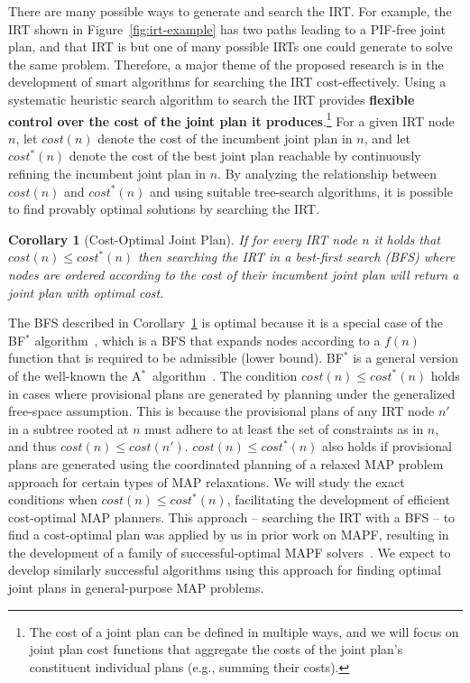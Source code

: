 \documentclass[11pt]{article}
\newcommand{\astar}{A$^*$}
\newtheorem{corollary}{Corollary}
\begin{document}
There are many possible ways to generate and search the IRT. For example, the IRT shown in Figure~\ref{fig:irt-example} has two paths leading to a PIF-free joint plan, and that IRT is but one of many possible IRTs one could generate to solve the same problem. Therefore, a major theme of the proposed research is in the development of smart algorithms for searching the IRT cost-effectively. %
Using a systematic heuristic search algorithm to search the IRT provides {\bf flexible control over the cost of the joint plan it produces}.\footnote{The cost of a joint plan can be defined in multiple ways, and we will focus on joint plan cost functions that aggregate the costs of the joint plan's constituent individual plans (e.g., summing their costs).} 
For a given IRT node $n$, let $cost(n)$ denote the cost of the incumbent joint plan in $n$, and let $cost^*(n)$ denote the cost of the best joint plan reachable by continuously refining the incumbent joint plan in $n$.
By analyzing the relationship between $cost(n)$ and $cost^*(n)$ and using suitable tree-search algorithms, it is possible to find provably optimal solutions by searching the IRT. 


\begin{corollary}[Cost-Optimal Joint Plan]
If for every IRT node $n$ it holds that $cost(n)\leq cost^*(n)$ then searching the IRT in a best-first search (BFS) where nodes are ordered according to the cost of their incumbent joint plan 
will return a joint plan with optimal cost. 
\label{cor:optimal}
\end{corollary}
The BFS described in Corollary~\ref{cor:optimal} is optimal because it is a special case of the BF$^*$ algorithm~\cite{dechter1985generalized}, which is a BFS that expands nodes according to a $f(n)$ function that is required to be admissible (lower bound). BF$^*$ is a general version of the well-known the \astar\ algorithm~\cite{dechter1985generalized,hart1968formal}. 
The condition $cost(n)\leq cost^*(n)$ holds in cases where provisional plans are generated by planning under the generalized free-space assumption. 
This is because the provisional plans of any IRT node $n'$ in a subtree rooted at $n$ must adhere to at least the set of constraints as in $n$, and thus $cost(n)\leq cost(n')$. $cost(n)\leq cost^*(n)$ also holds if provisional plans are generated using the coordinated planning of a relaxed MAP problem approach for certain types of MAP relaxations. We will study the exact conditions when $cost(n)\leq cost^*(n)$, facilitating the development of efficient cost-optimal MAP planners. 
This approach -- searching the IRT with a BFS -- to find a cost-optimal plan was applied by us in prior work on MAPF, resulting in the development of a family of successful-optimal MAPF solvers~\cite{sharon2015conflict-based,boyarski2015don,boyarski2015icbs}. We expect to develop similarly successful algorithms using this approach for finding optimal joint plans in general-purpose MAP problems. 
\end{document}
